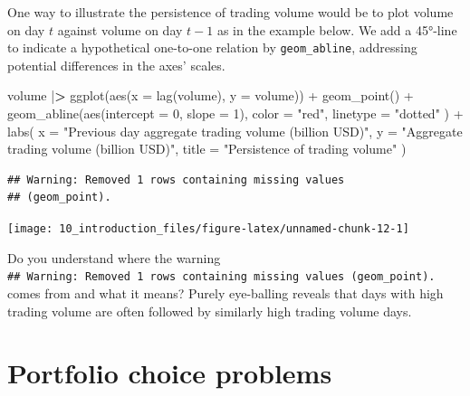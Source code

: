 \documentclass[
]{book}
\newenvironment{Shaded}{\begin{snugshade}}{\end{snugshade}}
\newcommand{\AttributeTok}[1]{\textcolor[rgb]{0.61,0.61,0.61}{#1}}
\newcommand{\DecValTok}[1]{\textcolor[rgb]{0.06,0.06,0.06}{#1}}
\newcommand{\ErrorTok}[1]{\textcolor[rgb]{0.14,0.14,0.14}{\textbf{#1}}}
\newcommand{\FunctionTok}[1]{\textcolor[rgb]{0,0,0}{#1}}
\newcommand{\NormalTok}[1]{#1}
\newcommand{\SpecialCharTok}[1]{\textcolor[rgb]{0,0,0}{#1}}
\newcommand{\StringTok}[1]{\textcolor[rgb]{0.5,0.5,0.5}{#1}}
\begin{document}
One way to illustrate the persistence of trading volume would be to plot volume on day \(t\) against volume on day \(t-1\) as in the example below. We add a 45°-line to indicate a hypothetical one-to-one relation by \texttt{geom\_abline}, addressing potential differences in the axes' scales.

\begin{Shaded}
\begin{Highlighting}[]
\NormalTok{volume }\SpecialCharTok{|}\ErrorTok{\textgreater{}}
  \FunctionTok{ggplot}\NormalTok{(}\FunctionTok{aes}\NormalTok{(}\AttributeTok{x =} \FunctionTok{lag}\NormalTok{(volume), }\AttributeTok{y =}\NormalTok{ volume)) }\SpecialCharTok{+}
  \FunctionTok{geom\_point}\NormalTok{() }\SpecialCharTok{+}
  \FunctionTok{geom\_abline}\NormalTok{(}\FunctionTok{aes}\NormalTok{(}\AttributeTok{intercept =} \DecValTok{0}\NormalTok{, }\AttributeTok{slope =} \DecValTok{1}\NormalTok{),}
    \AttributeTok{color =} \StringTok{"red"}\NormalTok{,}
    \AttributeTok{linetype =} \StringTok{"dotted"}
\NormalTok{  ) }\SpecialCharTok{+}
  \FunctionTok{labs}\NormalTok{(}
    \AttributeTok{x =} \StringTok{"Previous day aggregate trading volume (billion USD)"}\NormalTok{,}
    \AttributeTok{y =} \StringTok{"Aggregate trading volume (billion USD)"}\NormalTok{,}
    \AttributeTok{title =} \StringTok{"Persistence of trading volume"}
\NormalTok{  )}
\end{Highlighting}
\end{Shaded}

\begin{verbatim}
## Warning: Removed 1 rows containing missing values
## (geom_point).
\end{verbatim}

\begin{center}\texttt{[image: 10\_introduction\_files/figure-latex/unnamed-chunk-12-1]} \end{center}

Do you understand where the warning \texttt{\#\#\ Warning:\ Removed\ 1\ rows\ containing\ missing\ values\ (geom\_point).} comes from and what it means? Purely eye-balling reveals that days with high trading volume are often followed by similarly high trading volume days.

\hypertarget{portfolio-choice-problems}{%
\section{Portfolio choice problems}\label{portfolio-choice-problems}}
\end{document}
